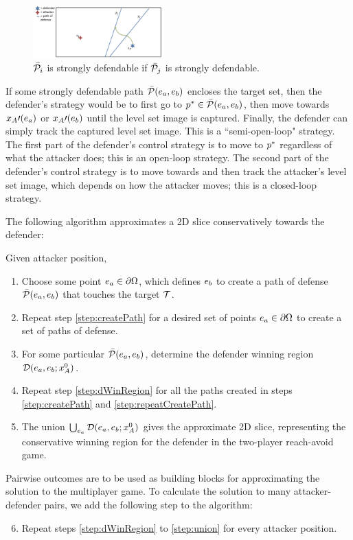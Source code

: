 \begin{figure}
\includegraphics[width=0.45\textwidth]{"fig/path behind"}
\caption{$\bar{\mathcal{P}}_{i}$ is strongly defendable if $\bar{\mathcal{P}}_{j}$ is strongly defendable.}
\label{fig:path_behind}
\end{figure}

If some strongly defendable path $\bar{\mathcal{P}}(e_a,e_b)$ encloses the target set, then the defender's strategy would be to first go to $p^*\in\bar{\mathcal{P}}(e_a,e_b)$, then move towards $x_A\prime(e_a)$ or $x_A\prime(e_b)$ until the level set image is captured. Finally, the defender can simply track the captured level set image. This is a ``semi-open-loop" strategy. The first part of the defender's control strategy is to move to $p^*$ regardless of what the attacker does; this is an open-loop strategy. The second part of the defender's control strategy is to move towards and then track the attacker's level set image, which depends on how the attacker moves; this is a closed-loop strategy.

The following algorithm approximates a 2D slice conservatively towards the defender:

\noindent Given attacker position,
\begin{enumerate}
\item Choose some point $e_a\in\partial\Omega$, which defines $e_b$ to create a path of defense $\bar{\mathcal{P}}(e_a,e_b)$ that touches the target $\mathcal{T}$. \label{step:createPath}
\item Repeat step \ref{step:createPath} for a desired set of points $e_a\in\partial\Omega$ to create a set of paths of defense. \label{step:repeatCreatePath}
\item For some particular $\bar{\mathcal{P}}(e_a,e_b)$, determine the defender winning region $\mathcal{D}(e_a,e_b;x_A^0)$.\label{step:dWinRegion}
\item Repeat step \ref{step:dWinRegion} for all the paths created in steps \ref{step:createPath} and \ref{step:repeatCreatePath}.
\item The union $\bigcup_{e_a} \mathcal{D}(e_a,e_b;x_A^0)$ gives the approximate 2D slice, representing the conservative winning region for the defender in the two-player reach-avoid game. \label{step:union}
\end{enumerate}

Pairwise outcomes are to be used as building blocks for approximating the solution to the multiplayer game. To calculate the solution to many attacker-defender pairs, we add the following step to the algorithm: 
\begin{enumerate}
\setcounter{enumi}{5}
\item Repeat steps \ref{step:dWinRegion} to \ref{step:union} for every attacker position.
\end{enumerate}

